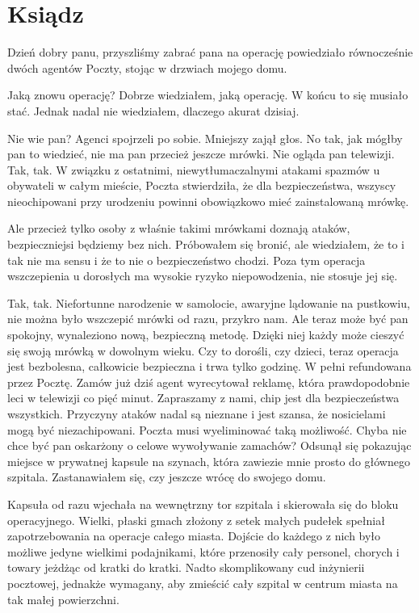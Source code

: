 \chapter{Ksiądz} 
\ds{} Dzień dobry panu, przyszliśmy zabrać pana na operację \dm{} powiedziało równocześnie dwóch agentów Poczty, stojąc w drzwiach mojego domu. \de{}

\ds{} Jaką znowu operację? \dm{} Dobrze wiedziałem, jaką operację. W końcu to się musiało stać. Jednak nadal nie wiedziałem, dlaczego akurat dzisiaj. \de{}

\ds{} Nie wie pan? \dm{} Agenci spojrzeli po sobie. Mniejszy zajął głos. \dm{} No tak, jak mógłby pan to wiedzieć, nie ma pan przecież jeszcze mrówki. Nie ogląda pan telewizji.
Tak, tak.
W związku z ostatnimi, niewytłumaczalnymi atakami spazmów u obywateli w całym mieście, Poczta stwierdziła, że dla bezpieczeństwa, 
wszyscy nieochipowani przy urodzeniu powinni obowiązkowo mieć zainstalowaną mrówkę. \de{}

\ds{} Ale przecież tylko osoby z właśnie takimi mrówkami doznają ataków, bezpieczniejsi będziemy bez nich. \dm{} Próbowałem się bronić, ale wiedziałem, że
to i tak nie ma sensu i że to nie o bezpieczeństwo chodzi. \dm{} Poza tym operacja wszczepienia u dorosłych ma wysokie ryzyko niepowodzenia, nie stosuje jej się. \dm{}

\ds{} Tak, tak. Niefortunne narodzenie w samolocie, awaryjne lądowanie na pustkowiu, nie można było wszczepić mrówki od razu, przykro nam.
Ale teraz może być pan spokojny, wynaleziono nową, bezpieczną metodę. Dzięki niej każdy może cieszyć się swoją mrówką w dowolnym wieku.
Czy to dorośli, czy dzieci, teraz operacja jest bezbolesna, całkowicie bezpieczna i trwa tylko godzinę.
W pełni refundowana przez Pocztę. Zamów już dziś \dm{} agent wyrecytował reklamę, która prawdopodobnie leci w telewizji co pięć minut. \dm{}
Zapraszamy z nami, chip jest dla bezpieczeństwa wszystkich. Przyczyny ataków nadal są nieznane i jest szansa, że nosicielami mogą być niezachipowani.
Poczta musi wyeliminować taką możliwość.
Chyba nie chce być pan oskarżony o celowe wywoływanie zamachów? \dm{} Odsunął się pokazując miejsce w prywatnej kapsule na szynach, która zawiezie mnie prosto do 
głównego szpitala. Zastanawiałem się, czy jeszcze wrócę do swojego domu.

Kapsuła od razu wjechała na wewnętrzny tor szpitala i skierowała się do bloku operacyjnego. 
Wielki, płaski gmach złożony z setek małych pudełek spełniał zapotrzebowania na operacje całego miasta.
Dojście do każdego z nich było możliwe jedyne wielkimi podajnikami, które przenosiły cały personel, chorych i towary jeżdżąc od kratki do kratki.
Nadto skomplikowany cud inżynierii pocztowej, jednakże wymagany, aby zmieścić cały szpital w centrum miasta na tak małej powierzchni.

